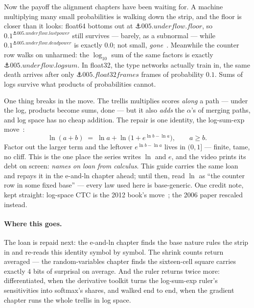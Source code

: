 \begin{narrative}
Now the payoff the alignment chapters have been waiting for. A machine
multiplying many small probabilities is walking down the strip, and
the floor is closer than it looks: float64 bottoms out at
$\anchor{005.underflow.floor}$, so
$0.1^{\anchor{005.underflow.lastpower}}$ still survives — barely, as a
subnormal — while $0.1^{\anchor{005.underflow.deadpower}}$ is exactly
$0.0$; not small, \emph{gone}~\cite{algebra-wikipedia-double-precision-floating-point-format}.
Meanwhile the counter row walks on unharmed: the $\log_{10}$ sum of
the same factors is exactly $\anchor{005.underflow.logsum}$. In
float32, the type networks actually train in, the same death arrives
after only $\anchor{005.float32frames}$ frames of probability $0.1$.
Sums of logs survive what products of probabilities cannot.

One thing breaks in the move. The trellis multiplies scores
\emph{along} a path — under the log, products become sums, done — but
it also \emph{adds} the $\alpha$'s of merging paths, and log space has
no cheap addition. The repair is one identity, the log-sum-exp
move~\cite{algebra-wikipedia-logsumexp}:
\[
  \ln(a+b) \;=\; \ln a + \ln\!\bigl(1 + e^{\ln b - \ln a}\bigr),
  \qquad a \ge b .
\]
Factor out the larger term and the leftover $e^{\ln b - \ln a}$ lives
in $(0, 1]$ — finite, tame, no cliff. This is the one place the
series writes $\ln$ and $e$, and the video prints its debt on screen:
\emph{names on loan from calculus}. This guide carries the same loan
and repays it in the e-and-ln chapter ahead; until then, read $\ln$ as
``the counter row in some fixed base'' — every law used here is
base-generic. One credit note, kept straight: log-space CTC is the
2012 book's move~\cite{algebra-graves-supervised-sequence-labelling-with-rnns-7-3-1};
the 2006 paper rescaled instead.

\paragraph{Where this goes.} The loan is repaid next: the e-and-ln
chapter finds the base nature rules the strip in and re-reads this
identity symbol by symbol. The shrink counts return averaged — the
random-variables chapter finds the sixteen-cell square carries exactly
$4$ bits of surprisal on average. And the ruler returns twice more:
differentiated, when the derivative toolkit turns the log-sum-exp
ruler's sensitivities into softmax's shares, and walked end to end,
when the gradient chapter runs the whole trellis in log space.
\end{narrative}

